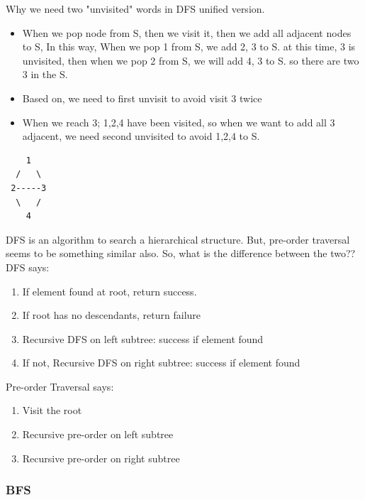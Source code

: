 \documentclass[a4paper,11pt,twoside]{book}
\begin{document}
	\par  Why we need two "unvisited" words in DFS unified version.  
\begin{itemize}
\item When we pop node from S, then we visit it, then we add all adjacent nodes to S, In this way, When we pop 1 from S, we add 2, 3 to S. at this time, 3 is unvisited, then when we pop 2 from S, we will add 4, 3 to S. so there are two 3 in the S. 
\item Based on, we need to first unvisit to avoid visit 3 twice

\item When we reach 3; 1,2,4 have been visited, so when we want to add all 3 adjacent, we need second unvisited to avoid 1,2,4 to S.  
\end{itemize}
\begin{verbatim}
    1
  /   \
 2-----3
  \   /
    4      
\end{verbatim}

\par DFS is an algorithm to search a hierarchical structure. But, pre-order traversal seems to be something similar also. So, what is the difference between the two?? DFS says:
\begin{enumerate}
\item If element found at root, return success.
\item If root has no descendants, return failure
\item Recursive DFS on left subtree: success if element found
\item If not, Recursive DFS on right subtree: success if element found
\end{enumerate}

Pre-order Traversal says:
\begin{enumerate}
\item Visit the root
\item Recursive pre-order on left subtree
\item Recursive pre-order on right subtree
\end{enumerate}


\subsubsection{BFS}
\end{document}
